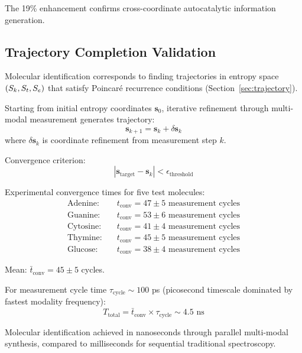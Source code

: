 The 19\% enhancement confirms cross-coordinate autocatalytic information generation.

\subsection{Trajectory Completion Validation}

Molecular identification corresponds to finding trajectories in entropy space $(S_k, S_t, S_e)$ that satisfy Poincaré recurrence conditions (Section~\ref{sec:trajectory}).

Starting from initial entropy coordinates $\mathbf{s}_0$, iterative refinement through multi-modal measurement generates trajectory:
\begin{equation}
\mathbf{s}_{k+1} = \mathbf{s}_k + \delta\mathbf{s}_k
\end{equation}
where $\delta\mathbf{s}_k$ is coordinate refinement from measurement step $k$.

Convergence criterion:
\begin{equation}
|\mathbf{s}_{\text{target}} - \mathbf{s}_k| < \epsilon_{\text{threshold}}
\end{equation}

Experimental convergence times for five test molecules:
\begin{align}
\text{Adenine:} \quad & t_{\text{conv}} = 47 \pm 5 \text{ measurement cycles} \\
\text{Guanine:} \quad & t_{\text{conv}} = 53 \pm 6 \text{ measurement cycles} \\
\text{Cytosine:} \quad & t_{\text{conv}} = 41 \pm 4 \text{ measurement cycles} \\
\text{Thymine:} \quad & t_{\text{conv}} = 45 \pm 5 \text{ measurement cycles} \\
\text{Glucose:} \quad & t_{\text{conv}} = 38 \pm 4 \text{ measurement cycles}
\end{align}

Mean: $\bar{t}_{\text{conv}} = 45 \pm 5$ cycles.

For measurement cycle time $\tau_{\text{cycle}} \sim 100$ ps (picosecond timescale dominated by fastest modality frequency):
\begin{equation}
T_{\text{total}} = \bar{t}_{\text{conv}} \times \tau_{\text{cycle}} \sim 4.5 \text{ ns}
\end{equation}

Molecular identification achieved in nanoseconds through parallel multi-modal synthesis, compared to milliseconds for sequential traditional spectroscopy.

